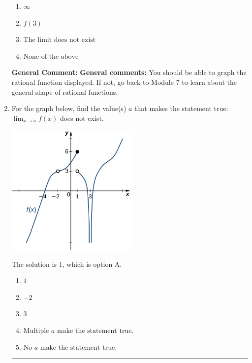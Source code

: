 \documentclass{extbook}[14pt]
\newcommand{\litem}[1]{\item #1

\rule{\textwidth}{0.4pt}}
\begin{document}
\begin{enumerate}
{\begin{enumerate}[label=\Alph*.]
\item \( \infty \)


\item \( f(3) \)


\item \( \text{The limit does not exist} \)


\item \( \text{None of the above} \)


\end{enumerate}

\textbf{General Comment:} \textbf{General comments:} You should be able to graph the rational function displayed. If not, go back to Module 7 to learn about the general shape of rational functions.
}
\litem{
For the graph below, find the value(s) $a$ that makes the statement true: $ \displaystyle \lim_{x \rightarrow a} f(x)$ does not exist.

\begin{center}
    \includegraphics[width=0.5\textwidth]{../Figures/evaluateLimitGraphicallyCopyC.png}
\end{center}




The solution is \( 1 \), which is option A.\begin{enumerate}[label=\Alph*.]
\item \( 1 \)


\item \( -2 \)


\item \( 3 \)


\item \( \text{Multiple } a \text{ make the statement true}. \)


\item \( \text{No } a \text{ make the statement true}. \)


\end{enumerate}

}
\end{enumerate}
\end{document}
